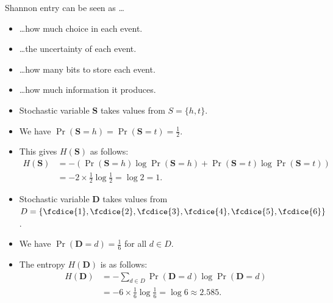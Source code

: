 \documentclass{beamer}
\let\stoch\mathbf{}
\begin{document}
\begin{frame}
  \begin{block}{Shannon entry can be seen as \dots}
    \begin{itemize}
      \item \dots how much choice in each event.

      \item \dots the uncertainty of each event.

      \item \dots how many bits to store each event.

      \item \dots how much information it produces.

    \end{itemize}
  \end{block}
\end{frame}

\begin{frame}
  \begin{example}
    \begin{itemize}
      \item Stochastic variable \(\stoch{S}\) takes values from \(S = \{h, 
          t\}\).
      \item We have \(\Pr(\stoch S = h) = \Pr(\stoch S = t) = \frac{1}{2}.\)
      \item This gives \(H(\stoch S)\) as follows:
        \begin{align*}
          H(\stoch S) &= -\left( \Pr(\stoch S = h)\log \Pr(\stoch S = h) 
            + \Pr(\stoch S = t) \log \Pr(\stoch S = t) \right) \\
          &= -2\times \frac{1}{2}\log \frac{1}{2} = \log 2 = 1.
        \end{align*}
    \end{itemize}
  \end{example}
\end{frame}

\begin{frame}
  \begin{example}
    \begin{itemize}
      \item Stochastic variable \(\stoch D\) takes values from \(D 
          = \{\fcdice{1}, \fcdice{2}, \fcdice{3}, \fcdice{4}, \fcdice{5}, 
          \fcdice{6}\}\).
      \item We have \(\Pr(\stoch D = d) = \frac{1}{6}\) for all \(d\in D\).
      \item The entropy \(H(\stoch D)\) is as follows:
        \begin{align*}
          H(\stoch D) &= -\sum_{d\in D} \Pr(\stoch D = d)\log\Pr(\stoch D = d) \\
          &= -6\times \frac{1}{6}\log\frac{1}{6} = \log 6 \approx 2.585.
        \end{align*}
    \end{itemize}
  \end{example}
\end{frame}
\end{document}
